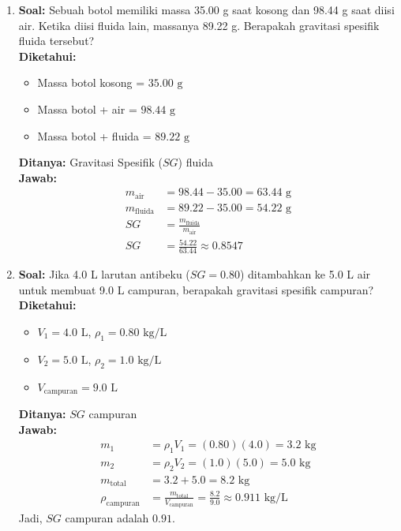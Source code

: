 \documentclass[twocolumn]{article}
\begin{document}
\begin{enumerate}
    \item \textbf{Soal:} Sebuah botol memiliki massa 35.00 g saat kosong dan 98.44 g saat diisi air. Ketika diisi fluida lain, massanya 89.22 g. Berapakah gravitasi spesifik fluida tersebut? \\
    \textbf{Diketahui:}
    \begin{itemize}
        \item Massa botol kosong = $35.00 \text{ g}$
        \item Massa botol + air = $98.44 \text{ g}$
        \item Massa botol + fluida = $89.22 \text{ g}$
    \end{itemize}
    \textbf{Ditanya:} Gravitasi Spesifik ($SG$) fluida \\
    \textbf{Jawab:}
    \begin{align*}
        m_{\text{air}} &= 98.44 - 35.00 = 63.44 \text{ g} \\
        m_{\text{fluida}} &= 89.22 - 35.00 = 54.22 \text{ g} \\
        SG &= \frac{m_{\text{fluida}}}{m_{\text{air}}} \\
        SG &= \frac{54.22}{63.44} \approx 0.8547
    \end{align*}

    \item \textbf{Soal:} Jika 4.0 L larutan antibeku ($SG = 0.80$) ditambahkan ke 5.0 L air untuk membuat 9.0 L campuran, berapakah gravitasi spesifik campuran? \\
    \textbf{Diketahui:}
    \begin{itemize}
        \item $V_1 = 4.0 \text{ L}$, $\rho_1 = 0.80 \text{ kg/L}$
        \item $V_2 = 5.0 \text{ L}$, $\rho_2 = 1.0 \text{ kg/L}$
        \item $V_{\text{campuran}} = 9.0 \text{ L}$
    \end{itemize}
    \textbf{Ditanya:} $SG$ campuran \\
    \textbf{Jawab:}
    \begin{align*}
        m_1 &= \rho_1 V_1 = (0.80)(4.0) = 3.2 \text{ kg} \\
        m_2 &= \rho_2 V_2 = (1.0)(5.0) = 5.0 \text{ kg} \\
        m_{\text{total}} &= 3.2 + 5.0 = 8.2 \text{ kg} \\
        \rho_{\text{campuran}} &= \frac{m_{\text{total}}}{V_{\text{campuran}}} = \frac{8.2}{9.0} \approx 0.911 \text{ kg/L}
    \end{align*}
    Jadi, $SG$ campuran adalah $0.91$.


\end{enumerate}
\end{document}
